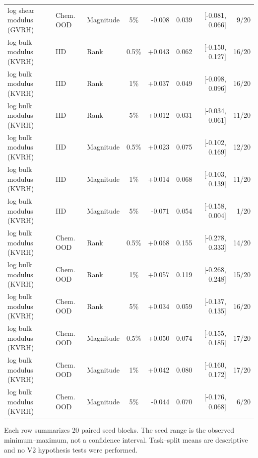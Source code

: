 \begin{longtable}{@{}lllc rrrr@{}}
log shear modulus (GVRH) & Chem. OOD & Magnitude & 5\% & -0.008 & 0.039 & [-0.081, 0.066] & 9/20 \\
log bulk modulus (KVRH) & IID & Rank & 0.5\% & +0.043 & 0.062 & [-0.150, 0.127] & 16/20 \\
log bulk modulus (KVRH) & IID & Rank & 1\% & +0.037 & 0.049 & [-0.098, 0.096] & 16/20 \\
log bulk modulus (KVRH) & IID & Rank & 5\% & +0.012 & 0.031 & [-0.034, 0.061] & 11/20 \\
log bulk modulus (KVRH) & IID & Magnitude & 0.5\% & +0.023 & 0.075 & [-0.102, 0.169] & 12/20 \\
log bulk modulus (KVRH) & IID & Magnitude & 1\% & +0.014 & 0.068 & [-0.103, 0.139] & 11/20 \\
log bulk modulus (KVRH) & IID & Magnitude & 5\% & -0.071 & 0.054 & [-0.158, 0.004] & 1/20 \\
log bulk modulus (KVRH) & Chem. OOD & Rank & 0.5\% & +0.068 & 0.155 & [-0.278, 0.333] & 14/20 \\
log bulk modulus (KVRH) & Chem. OOD & Rank & 1\% & +0.057 & 0.119 & [-0.268, 0.248] & 15/20 \\
log bulk modulus (KVRH) & Chem. OOD & Rank & 5\% & +0.034 & 0.059 & [-0.137, 0.135] & 16/20 \\
log bulk modulus (KVRH) & Chem. OOD & Magnitude & 0.5\% & +0.050 & 0.074 & [-0.155, 0.185] & 17/20 \\
log bulk modulus (KVRH) & Chem. OOD & Magnitude & 1\% & +0.042 & 0.080 & [-0.160, 0.172] & 17/20 \\
log bulk modulus (KVRH) & Chem. OOD & Magnitude & 5\% & -0.044 & 0.070 & [-0.176, 0.068] & 6/20 \\
\end{longtable}
\noindent\footnotesize Each row summarizes 20 paired seed blocks. The seed range is the observed minimum--maximum, not a confidence interval. Task--split means are descriptive and no V2 hypothesis tests were performed.
